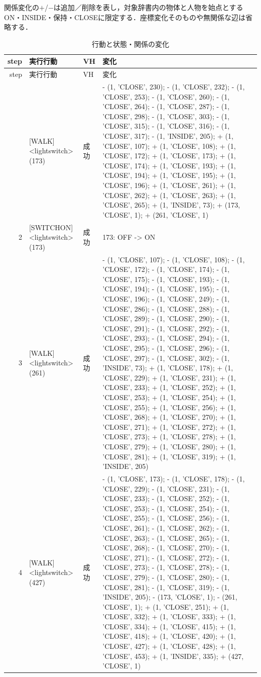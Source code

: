 関係変化の$+$/$-$は追加／削除を表し，対象辞書内の物体と人物を始点とするON・INSIDE・保持・CLOSEに限定する．座標変化そのものや無関係な辺は省略する．
{\scriptsize\setlength{\tabcolsep}{3pt}
\begin{longtable}{rp{.28\linewidth}lp{.48\linewidth}}
\caption{行動と状態・関係の変化}\label{tab:real_changes_test_task6}\\
\hline
step & 実行行動 & VH & 変化\\\hline\endfirsthead
step & 実行行動 & VH & 変化\\\hline\endhead
\hline\endfoot
1 & [WALK] \textless{}lightswitch\textgreater{} (173) & 成功 & - (1, 'CLOSE', 230); - (1, 'CLOSE', 232); - (1, 'CLOSE', 253); - (1, 'CLOSE', 260); - (1, 'CLOSE', 264); - (1, 'CLOSE', 287); - (1, 'CLOSE', 298); - (1, 'CLOSE', 303); - (1, 'CLOSE', 315); - (1, 'CLOSE', 316); - (1, 'CLOSE', 317); - (1, 'INSIDE', 205); + (1, 'CLOSE', 107); + (1, 'CLOSE', 108); + (1, 'CLOSE', 172); + (1, 'CLOSE', 173); + (1, 'CLOSE', 174); + (1, 'CLOSE', 193); + (1, 'CLOSE', 194); + (1, 'CLOSE', 195); + (1, 'CLOSE', 196); + (1, 'CLOSE', 261); + (1, 'CLOSE', 262); + (1, 'CLOSE', 263); + (1, 'CLOSE', 265); + (1, 'INSIDE', 73); + (173, 'CLOSE', 1); + (261, 'CLOSE', 1) \\
2 & [SWITCHON] \textless{}lightswitch\textgreater{} (173) & 成功 & 173: OFF -\textgreater{} ON \\
3 & [WALK] \textless{}lightswitch\textgreater{} (261) & 成功 & - (1, 'CLOSE', 107); - (1, 'CLOSE', 108); - (1, 'CLOSE', 172); - (1, 'CLOSE', 174); - (1, 'CLOSE', 175); - (1, 'CLOSE', 193); - (1, 'CLOSE', 194); - (1, 'CLOSE', 195); - (1, 'CLOSE', 196); - (1, 'CLOSE', 249); - (1, 'CLOSE', 286); - (1, 'CLOSE', 288); - (1, 'CLOSE', 289); - (1, 'CLOSE', 290); - (1, 'CLOSE', 291); - (1, 'CLOSE', 292); - (1, 'CLOSE', 293); - (1, 'CLOSE', 294); - (1, 'CLOSE', 295); - (1, 'CLOSE', 296); - (1, 'CLOSE', 297); - (1, 'CLOSE', 302); - (1, 'INSIDE', 73); + (1, 'CLOSE', 178); + (1, 'CLOSE', 229); + (1, 'CLOSE', 231); + (1, 'CLOSE', 233); + (1, 'CLOSE', 252); + (1, 'CLOSE', 253); + (1, 'CLOSE', 254); + (1, 'CLOSE', 255); + (1, 'CLOSE', 256); + (1, 'CLOSE', 268); + (1, 'CLOSE', 270); + (1, 'CLOSE', 271); + (1, 'CLOSE', 272); + (1, 'CLOSE', 273); + (1, 'CLOSE', 278); + (1, 'CLOSE', 279); + (1, 'CLOSE', 280); + (1, 'CLOSE', 281); + (1, 'CLOSE', 319); + (1, 'INSIDE', 205) \\
4 & [WALK] \textless{}lightswitch\textgreater{} (427) & 成功 & - (1, 'CLOSE', 173); - (1, 'CLOSE', 178); - (1, 'CLOSE', 229); - (1, 'CLOSE', 231); - (1, 'CLOSE', 233); - (1, 'CLOSE', 252); - (1, 'CLOSE', 253); - (1, 'CLOSE', 254); - (1, 'CLOSE', 255); - (1, 'CLOSE', 256); - (1, 'CLOSE', 261); - (1, 'CLOSE', 262); - (1, 'CLOSE', 263); - (1, 'CLOSE', 265); - (1, 'CLOSE', 268); - (1, 'CLOSE', 270); - (1, 'CLOSE', 271); - (1, 'CLOSE', 272); - (1, 'CLOSE', 273); - (1, 'CLOSE', 278); - (1, 'CLOSE', 279); - (1, 'CLOSE', 280); - (1, 'CLOSE', 281); - (1, 'CLOSE', 319); - (1, 'INSIDE', 205); - (173, 'CLOSE', 1); - (261, 'CLOSE', 1); + (1, 'CLOSE', 251); + (1, 'CLOSE', 332); + (1, 'CLOSE', 333); + (1, 'CLOSE', 334); + (1, 'CLOSE', 415); + (1, 'CLOSE', 418); + (1, 'CLOSE', 420); + (1, 'CLOSE', 427); + (1, 'CLOSE', 428); + (1, 'CLOSE', 453); + (1, 'INSIDE', 335); + (427, 'CLOSE', 1) \\

\end{longtable}}
